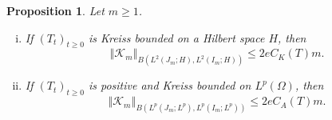 \documentclass[12pt]{amsart}
\theoremstyle{plain}
\newtheorem{prop}[thm]{Proposition}
\theoremstyle{remark}
\theoremstyle{definition}
\newcommand{\norm}[1]{\left\Vert #1\right\Vert}
\begin{document}
	\begin{prop}
		\label{propTriangularContinuous}
		Let $m\ge1$.
		
		\begin{enumerate}[(i)]
			\item
			If $(T_t)_{t\ge0}$ is Kreiss bounded on a Hilbert space $H$, then
			\begin{equation*}\label{eqTriangularContinuousH}
				\norm{\mathcal K_m}_{
					B(L^2(J_m;H),L^2(I_m;H))}
				\le
				2eC_K(T)m.
			\end{equation*}
			
			\item
			If $(T_t)_{t\ge0}$ is positive and Kreiss bounded on $L^p(\Omega)$, then
			\begin{equation*}\label{eqTriangularPositiveContinuous}
				\norm{\mathcal K_m}_{
					B(L^p(J_m;L^p),L^p(I_m;L^p))}
				\le
				2eC_A(T)m.
			\end{equation*}
		\end{enumerate}
	\end{prop}
	
\end{document}
